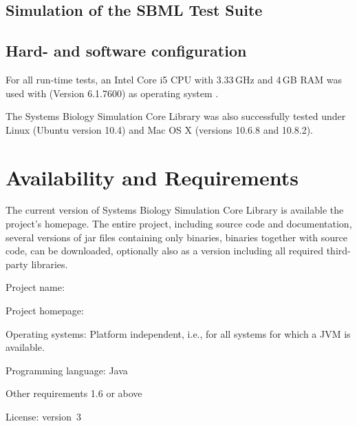 \documentclass[10pt]{bmc_article}
\newenvironment{bmcformat}{\begin{raggedright}\baselineskip20pt\sloppy\setboolean{publ}{false}}{\end{raggedright}\baselineskip20pt\sloppy}
\begin{document}
\begin{bmcformat}
\subsection*{Simulation of the SBML Test Suite}


\subsection*{Hard- and software configuration}

For all run-time tests, an Intel\textsuperscript{\textregistered}
Core\texttrademark{} i5 CPU with 3.33\,GHz and 4\,GB RAM was used with
(Version 6.1.7600) as operating system .

The Systems Biology Simulation Core Library was also successfully 
tested under Linux (Ubuntu version 10.4) and Mac OS X (versions 10.6.8 and 10.8.2).

\section*{Availability and Requirements}

The current version of Systems Biology Simulation Core Library is available
 the project's homepage.
The entire project, including source code and documentation, several versions of
jar files containing only binaries, binaries together with source code, can be
downloaded, optionally also as a version including all required third-party
libraries.
\begin{description}
  \item{Project name:}         
  \item{Project homepage:}     
  \item{Operating systems:}    Platform independent, i.e., for all systems for which a JVM is available.
  \item{Programming language:} Java\texttrademark
  \item{Other requirements}     1.6 or above
  \item{License:}               version~3
\end{description}


\end{bmcformat}
\end{document}
